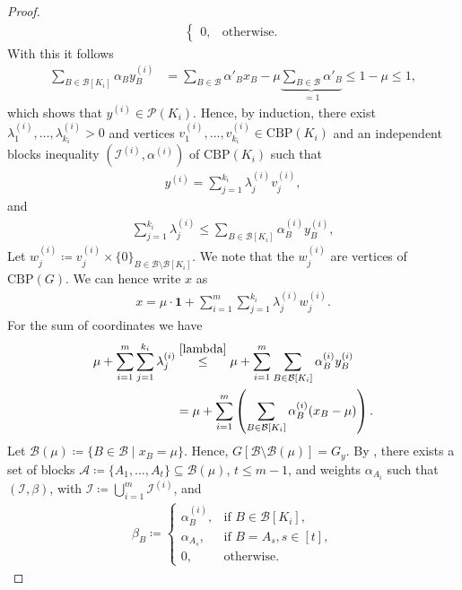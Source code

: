\documentclass[10pt,a4paper]{amsart}
\newcommand{\A}{\mathcal{A}}
\newcommand{\B}{\mathcal{B}}
\newcommand{\CBP}{\mathrm{CBP}}
\newcommand{\I}{\mathcal{I}}
\renewcommand{\P}{\mathcal{P}}
\begin{document}
\begin{proof}
\begin{align*}
\begin{cases}
                                0,& \text{otherwise.}\end{cases}
    \end{align*}
    With this it follows
    \begin{align*}
        \sum_{B \in \B[K_i]}\alpha_By_B^{(i)}&=\sum_{B \in \B}\alpha'_Bx_B-\mu\underbrace{\sum_{B \in \B}\alpha'_B}_{=1} \le 1-\mu\le 1,
    \end{align*}
    which shows that $y^{(i)} \in \P(K_i)$. Hence, by induction, there exist $\lambda_1^{(i)},\ldots,\lambda_{k_i}^{(i)}>0$ and vertices $v_1^{(i)},\ldots,v_{k_i}^{(i)}\in \CBP(K_i)$ and an independent blocks inequality $(\I^{(i)},\alpha^{(i)})$ of $\CBP(K_i)$ such that
    \begin{align*}
        y^{(i)}=\sum_{j=1}^{k_i} \lambda_j^{(i)}v_j^{(i)},
    \end{align*}
    and
    \begin{align}
    \label{lambda}
        \sum_{j=1}^{k_i}\lambda_j^{(i)} \le \sum_{B \in \B[K_i]} \alpha^{(i)}_By^{(i)}_B,
    \end{align}
    Let $w_j^{(i)}\coloneqq v_j^{(i)} \times \{0\}_{B \in \B\setminus\B [K_i]}$. We note that the $w_j^{(i)}$ are vertices of $\CBP(G)$. We can hence write $x$ as
    \begin{align*}
        x=\mu \cdot \mathbf{1} + \sum_{i=1}^m\sum_{j=1}^{k_i} \lambda_j^{(i)}w_j^{(i)}.
    \end{align*}
    For the sum of coordinates we have
    \begin{align*}
        \mu+\sum_{i=1}^m\sum_{j=1}^{k_i} \lambda_j^{(i)} &\overset{\eqref{lambda}}{\le} \mu+\sum_{i=1}^m\sum_{B \in \B[K_i]} \alpha^{(i)}_By_B^{(i)} \\
        &= \mu+\sum_{i=1}^m \left(\sum_{B \in \B[K_i]} \alpha^{(i)}_B(x_B-\mu) \right).
    \end{align*}
    Let $\B(\mu) \coloneqq \{ B \in \B \mid x_B=\mu\}$. Hence, $G[\B \setminus \B(\mu)]=G_y$. By , there exists a set of blocks $\A\coloneqq \{A_1,\ldots,A_t\} \subseteq \B(\mu)$, $t \le m-1$, and weights $\alpha_{A_i}$ such that  $(\I,\beta)$, with $\I \coloneqq \bigcup_{i=1}^m\I^{(i)}$, and
    \begin{align*}
        \beta_B\coloneqq \begin{cases} \alpha^{(i)}_B, &\text{if } B \in \B[K_i], \\
                                       \alpha_{A_s}, &\text{if } B=A_s, s \in [t], \\
                                       0, &\text{otherwise}.

\end{cases}
\end{align*}
\end{proof}
\end{document}
